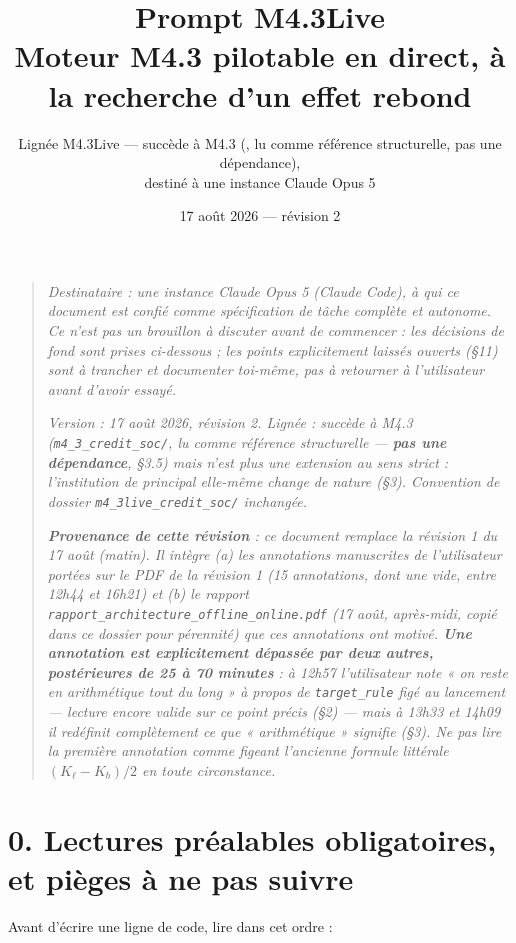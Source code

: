 \documentclass[11pt,a4paper]{article}
\title{Prompt M4.3Live\\
\large Moteur M4.3 pilotable en direct, à la recherche d'un effet rebond}
\author{Lignée M4.3Live --- succède à M4.3 (\code{m4\_3\_credit\_soc}, lu
comme référence structurelle, pas une dépendance),\\
destiné à une instance Claude Opus 5}
\date{17 août 2026 --- révision 2}
\newcommand{\code}[1]{\texttt{#1}}
\begin{document}
\maketitle

\begin{quote}
\sloppy
\emph{Destinataire : une instance Claude Opus 5 (Claude Code), à qui ce
document est confié comme spécification de tâche complète et autonome. Ce
n'est pas un brouillon à discuter avant de commencer : les décisions de
fond sont prises ci-dessous ; les points explicitement laissés ouverts
(\S11) sont à trancher et documenter toi-même, pas à retourner à
l'utilisateur avant d'avoir essayé.}

\emph{Version : 17 août 2026, révision 2. Lignée : succède à M4.3
(\code{m4\_3\_credit\_soc/}, lu comme référence structurelle ---
\textbf{pas une dépendance}, \S3.5) mais n'est plus une extension au sens
strict : l'institution de principal elle-même change de nature (\S3).
Convention de dossier \code{m4\_3live\_credit\_soc/} inchangée.}

\emph{\textbf{Provenance de cette révision} : ce document remplace la
révision 1 du 17 août (matin). Il intègre (a) les annotations
manuscrites de l'utilisateur portées sur le PDF de la révision 1 (15
annotations, dont une vide, entre 12h44 et 16h21) et (b) le rapport
\code{rapport\_architecture\_offline\_online.pdf} (17 août,
après-midi, copié dans ce dossier pour pérennité) que ces annotations ont
motivé. \textbf{Une annotation est explicitement dépassée par deux
autres, postérieures de 25 à 70 minutes} : à 12h57 l'utilisateur note
« on reste en arithmétique tout du long » à propos de \code{target\_rule}
figé au lancement --- lecture encore valide sur ce point précis (\S2) ---
mais à 13h33 et 14h09 il redéfinit complètement ce que « arithmétique »
signifie (\S3). Ne pas lire la première annotation comme figeant
l'ancienne formule littérale $(K_\ell-K_b)/2$ en toute circonstance.}
\end{quote}

\tableofcontents

\section*{0. Lectures préalables obligatoires, et pièges à ne pas suivre}

Avant d'écrire une ligne de code, lire dans cet ordre :
\end{document}
